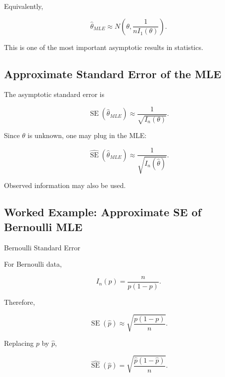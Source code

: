 Equivalently,

\[
\boxed{
\widehat{\theta}_{MLE}
\approx
N
\left(
\theta,
\frac1{nI_1(\theta)}
\right).
}
\]

This is one of the most important asymptotic results in statistics.

\subsection{Approximate Standard Error of the MLE}
\label{subsec:approx-se-mle}

The asymptotic standard error is

\[
\boxed{
\operatorname{SE}
(
\widehat{\theta}_{MLE}
)
\approx
\frac1{
\sqrt{
I_n(\theta)
}
}.
}
\]

Since \(\theta\) is unknown, one may plug in the MLE:

\[
\boxed{
\widehat{\operatorname{SE}}
(
\widehat{\theta}_{MLE}
)
\approx
\frac1{
\sqrt{
I_n(\widehat{\theta})
}
}.
}
\]

Observed information may also be used.

\subsection{Worked Example: Approximate SE of Bernoulli MLE}
\label{subsec:worked-se-bernoulli-mle}

\begin{workedexamplebox}{Bernoulli Standard Error}

For Bernoulli data,

\[
I_n(p)
=
\frac{n}{
p(1-p)
}.
\]

Therefore,

\[
\operatorname{SE}(\widehat{p})
\approx
\sqrt{
\frac{
p(1-p)
}{n}
}.
\]

Replacing \(p\) by \(\widehat{p}\),

\begin{answerbox}
\[
\boxed{
\widehat{\operatorname{SE}}(\widehat{p})
=
\sqrt{
\frac{
\widehat{p}(1-\widehat{p})
}{n}
}.
}
\]
\end{answerbox}

\end{workedexamplebox}

